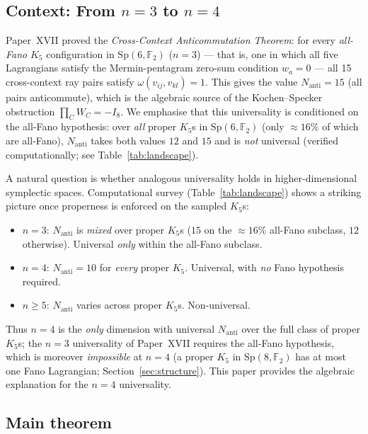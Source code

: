 \documentclass[11pt,a4paper]{article}
\theoremstyle{remark}
\newcommand{\Sp}{\mathrm{Sp}}
\begin{document}
\subsection*{\texorpdfstring{Context: From $n=3$ to $n=4$}{Context: From n=3 to n=4}}

Paper~XVII \cite{PaperXVII} proved the \emph{Cross-Context Anticommutation Theorem}:
for every \emph{all-Fano} $K_5$ configuration in $\Sp(6,\mathbb{F}_2)$ ($n=3$) ---
that is, one in which all five Lagrangians satisfy the Mermin-pentagram zero-sum
condition $w_a = 0$ --- all 15 cross-context ray pairs satisfy
$\omega(v_{ij}, v_{kl}) = 1$.
This gives the value $N_{\mathrm{anti}} = 15$ (all pairs anticommute),
which is the algebraic source of the Kochen--Specker obstruction $\prod_C W_C = -I_8$.
We emphasise that this universality is conditioned on the all-Fano hypothesis:
over \emph{all} proper $K_5$s in $\Sp(6,\mathbb{F}_2)$ (only $\approx 16\%$ of
which are all-Fano), $N_{\mathrm{anti}}$ takes both values $12$ and $15$ and is
\emph{not} universal (verified computationally; see Table~\ref{tab:landscape}).

A natural question is whether analogous universality holds in higher-dimensional
symplectic spaces.
Computational survey (Table~\ref{tab:landscape}) shows a striking picture
once properness is enforced on the sampled $K_5$s:
\begin{itemize}
  \item $n=3$: $N_{\mathrm{anti}}$ is \emph{mixed} over proper $K_5$s
        ($15$ on the $\approx 16\%$ all-Fano subclass, $12$ otherwise).
        Universal \emph{only} within the all-Fano subclass.
  \item $n=4$: $N_{\mathrm{anti}} = 10$ for \emph{every} proper $K_5$.  Universal,
        with \emph{no} Fano hypothesis required.
  \item $n \geq 5$: $N_{\mathrm{anti}}$ varies across proper $K_5$s.  Non-universal.
\end{itemize}
Thus $n=4$ is the \emph{only} dimension with universal $N_{\mathrm{anti}}$ over the
full class of proper $K_5$s; the $n=3$ universality of Paper~XVII requires the
all-Fano hypothesis, which is moreover \emph{impossible} at $n=4$ (a proper $K_5$
in $\Sp(8,\mathbb{F}_2)$ has at most one Fano Lagrangian; Section~\ref{sec:structure}).
This paper provides the algebraic explanation for the $n=4$ universality.

\subsection*{Main theorem}
\end{document}
